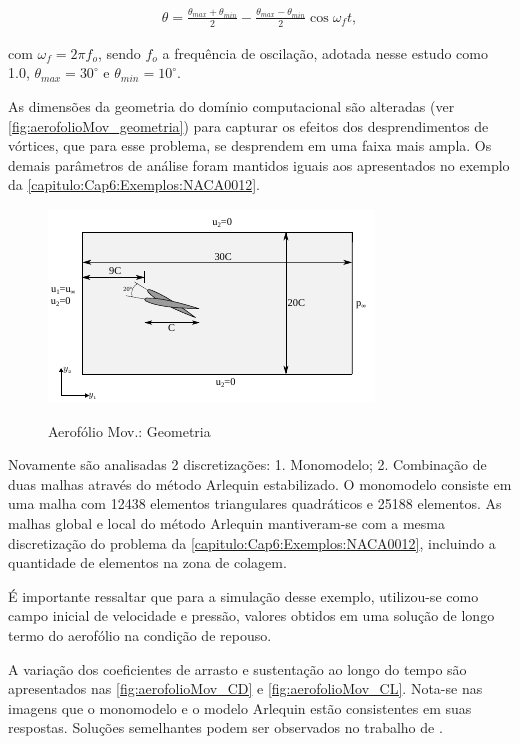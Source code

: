 \begin{align}
	\theta = \frac{\theta_{max}+\theta_{min}}{2} - \frac{\theta_{max}-\theta_{min}}{2}\cos{\omega_{f}t} ,
\end{align}

\noindent com $\omega_{f} = 2\pi f_{o}$, sendo $f_{o}$ a frequência de oscilação, adotada nesse estudo como 1.0, $\theta_{max} = 30^{\circ}$ e $\theta_{min} = 10^{\circ}$.

As dimensões da geometria do domínio computacional são alteradas (ver \autoref{fig:aerofolioMov_geometria}) para capturar os efeitos dos desprendimentos de vórtices, que para esse problema, se desprendem em uma faixa mais ampla. Os demais parâmetros de análise foram mantidos iguais aos apresentados no exemplo da \autoref{capitulo:Cap6:Exemplos:NACA0012}. 

\begin{figure}[!htbp]
	\caption{Aerofólio Mov.: Geometria}
	\centering 
	{\includegraphics[scale=2.0,trim=0cm 0cm 0cm 0cm, clip=true]{Imagens/Cap6/aerofolioMov_geometria.pdf}}	
	\label{fig:aerofolioMov_geometria}
\end{figure}

Novamente são analisadas 2 discretizações: 1. Monomodelo; 2. Combinação de duas malhas através do método Arlequin estabilizado.
O monomodelo consiste em uma malha com 12438 elementos triangulares quadráticos e 25188 elementos. As malhas global e local do método Arlequin mantiveram-se com a mesma discretização do problema da \autoref{capitulo:Cap6:Exemplos:NACA0012}, incluindo a quantidade de elementos na zona de colagem.

É importante ressaltar que para a simulação desse exemplo, utilizou-se como campo inicial de velocidade e pressão, valores obtidos em uma solução de longo termo do aerofólio na condição de repouso.

A variação dos coeficientes de arrasto e sustentação ao longo do tempo são apresentados nas \autoref{fig:aerofolioMov_CD} e \autoref{fig:aerofolioMov_CL}. Nota-se nas imagens que o monomodelo e o modelo Arlequin estão consistentes em suas respostas. Soluções semelhantes podem ser observados no trabalho de .


